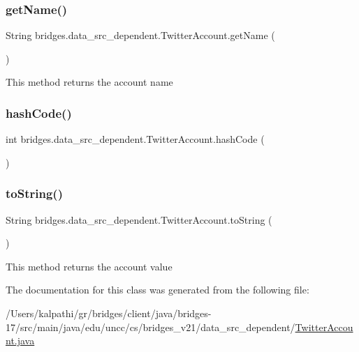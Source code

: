 \subsubsection{\texorpdfstring{get\+Name()}{getName()}}
{\footnotesize\ttfamily String bridges.\+data\+\_\+src\+\_\+dependent.\+Twitter\+Account.\+get\+Name (\begin{DoxyParamCaption}{ }\end{DoxyParamCaption})}

This method returns the account name \mbox{\label{classbridges_1_1data__src__dependent_1_1_twitter_account_a2f89f6f336b1bd39f0cf3aa444c76885}} 
\subsubsection{\texorpdfstring{hash\+Code()}{hashCode()}}
{\footnotesize\ttfamily int bridges.\+data\+\_\+src\+\_\+dependent.\+Twitter\+Account.\+hash\+Code (\begin{DoxyParamCaption}{ }\end{DoxyParamCaption})}

\mbox{\label{classbridges_1_1data__src__dependent_1_1_twitter_account_af4dd5dfe1a1556fa57f917fb24d8d6f2}} 
\subsubsection{\texorpdfstring{to\+String()}{toString()}}
{\footnotesize\ttfamily String bridges.\+data\+\_\+src\+\_\+dependent.\+Twitter\+Account.\+to\+String (\begin{DoxyParamCaption}{ }\end{DoxyParamCaption})}

This method returns the account value 

The documentation for this class was generated from the following file\+:\begin{DoxyCompactItemize}
\item 
/\+Users/kalpathi/gr/bridges/client/java/bridges-\/17/src/main/java/edu/uncc/cs/bridges\+\_\+v21/data\+\_\+src\+\_\+dependent/\mbox{\hyperlink{_twitter_account_8java}{Twitter\+Account.\+java}}\end{DoxyCompactItemize}
